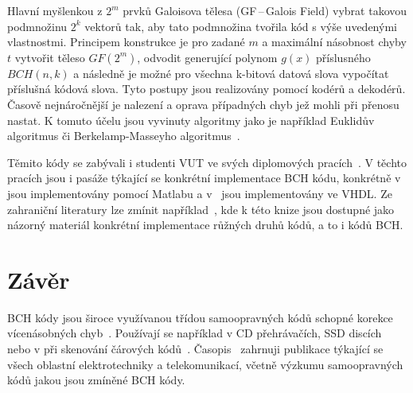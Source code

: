 \documentclass[a4paper,11pt]{article}[06-04-2023]
\begin{document}
Hlavní myšlenkou z $2^m$ prvků Galoisova tělesa (GF\,--\,Galois Field) vybrat takovou podmnožinu $2^k$ vektorů tak, aby tato podmnožina tvořila kód s výše uvedenými vlastnostmi. 
Principem konstrukce je pro zadané $m$ a maximální násobnost chyby $t$ vytvořit těleso $GF(2^m)$, odvodit generující polynom $g(x)$ příslusného $BCH(n,k)$ a následně je možné pro všechna k-bitová datová slova vypočítat příslušná kódová slova. 
Tyto postupy jsou realizovány pomocí kodérů a dekodérů. Časově nejnáročnější je nalezení a oprava případných chyb jež mohli při přenosu nastat. K tomuto účelu jsou vyvinuty algoritmy jako je například Euklidův algoritmus či Berkelamp-Masseyho algoritmus~\cite{Shu2}. 


Těmito kódy se zabývali i studenti VUT ve svých diplomových pracích~\cite{DP1,DP2}. V těchto pracích jsou i pasáže týkající se konkrétní implementace BCH kódu, konkrétně v~\cite{DP1} jsou implementovány pomocí Matlabu a v~\cite{DP2} jsou implementovány ve VHDL. 
Ze zahraniční literatury lze zmínit například~\cite{Morelos}, kde k této knize jsou dostupné jako názorný materiál konkrétní implementace růžných druhů kódů, a to i kódů BCH.

\section*{Závěr}
BCH kódy jsou široce využívanou třídou samoopravných kódů schopné korekce vícenásobných chyb~\cite{ece}. Používají se například v CD přehrávačích, SSD discích nebo v při skenování čárových kódů~\cite{Shu2}. 
Časopis~\cite{ijet} zahrnuji publikace týkající se všech oblastní elektrotechniky a telekomunikací, včetně výzkumu samoopravných kódů jakou jsou zmíněné BCH kódy.

\newpage

\renewcommand{\refname}{Literatura}

\end{document}
